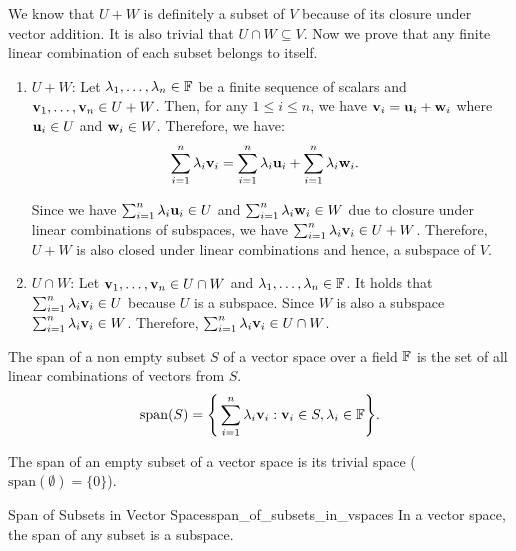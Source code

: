 \begin{proof*}
	We know that $U+W$ is definitely a subset of $V$ because of its closure under vector addition. It is also trivial that $U\cap W\subseteq V$. Now we prove that any finite linear combination of each subset belongs to itself.
	\begin{enumerate}
		\item $U+W$: Let $\lambda_1, \dots, \lambda_n \in \mathbb{F}$ be a finite sequence of scalars and ${\bf v}_1, \dots, {\bf v}_n\in U+W$. Then, for any $1\le i \le n$, we have ${\bf v}_i = {\bf u}_i + {\bf w}_i$ where ${\bf u}_i\in U$ and ${\bf w}_i \in W$. Therefore, we have:
		\begin{align*}
			\sum_{i=1}^n \lambda_i {\bf v}_i &= \sum_{i=1}^n \lambda_i {\bf u}_i + \sum_{i=1}^n \lambda_i {\bf w}_i.
		\end{align*} 

		\noindent Since we have $\sum_{i=1}^n \lambda_i {\bf u}_i\in U$ and $\sum_{i=1}^n \lambda_i {\bf w}_i \in W$ due to closure under linear combinations of subspaces, we have $\sum_{i=1}^n \lambda_i {\bf v}_i \in U+W$. Therefore, $U+W$ is also closed under linear combinations and hence, a subspace of $V$.

		\item $U\cap W$: Let ${\bf v}_1, \dots, {\bf v}_n \in U\cap W$ and $\lambda_1, \dots, \lambda_n\in\mathbb{F}$. It holds that $\sum_{i=1}^n\lambda_i{\bf v}_i \in U$ because $U$ is a subspace. Since $W$ is also a subspace $\sum_{i=1}^n \lambda_i{\bf v}_i \in W$. Therefore, $\sum_{i=1}^n\lambda_i{\bf v}_i\in U\cap W$. 
	\end{enumerate} 
\end{proof*} 

\begin{definition}
	The span of a non empty subset $S$ of a vector space over a field $\mathbb{F}$ is the set of all linear combinations of vectors from $S$.
	\begin{equation}
		\mathrm{span}(S) = \Bigg\{ 
			\sum_{i=1}^n \lambda_i {\bf v}_i : {\bf v}_i \in S, \lambda_i \in \mathbb{F}
		 \Bigg\}.
	\end{equation} 

	\noindent The span of an empty subset of a vector space is its trivial space ($\mathrm{span}(\emptyset) = \{0\}$).
\end{definition} 

\begin{proposition}{Span of Subsets in Vector Spaces}{span_of_subsets_in_vspaces}
	In a vector space, the span of any subset is a subspace.
\end{proposition} 

